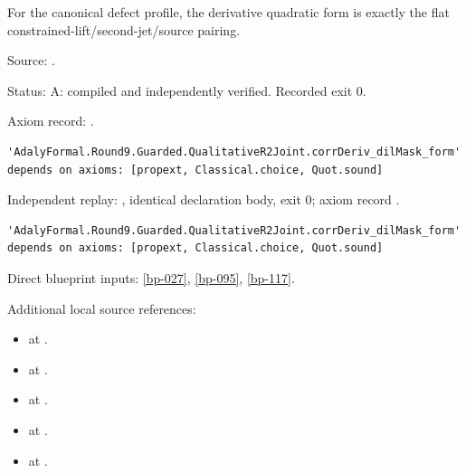 \begin{theorem}[bp-127]
\label{bp-127}
\leanok
For the canonical defect profile, the derivative quadratic form is exactly the flat constrained-lift/second-jet/source pairing.

\par Source: \texttt{}.
\par Status: A: compiled and independently verified. Recorded exit 0.
\par Axiom record: \texttt{}.
\begin{verbatim}
'AdalyFormal.Round9.Guarded.QualitativeR2Joint.corrDeriv_dilMask_form' depends on axioms: [propext, Classical.choice, Quot.sound]
\end{verbatim}
\par Independent replay: \texttt{}, identical declaration body, exit 0; axiom record \texttt{}.
\begin{verbatim}
'AdalyFormal.Round9.Guarded.QualitativeR2Joint.corrDeriv_dilMask_form' depends on axioms: [propext, Classical.choice, Quot.sound]
\end{verbatim}
\par Direct blueprint inputs: \ref{bp-027}, \ref{bp-095}, \ref{bp-117}.
\par Additional local source references:
\begin{itemize}
\item \texttt{} at \texttt{}.
\item \texttt{} at \texttt{}.
\item \texttt{} at \texttt{}.
\item \texttt{} at \texttt{}.
\item \texttt{} at \texttt{}.

\end{itemize}
\end{theorem}
